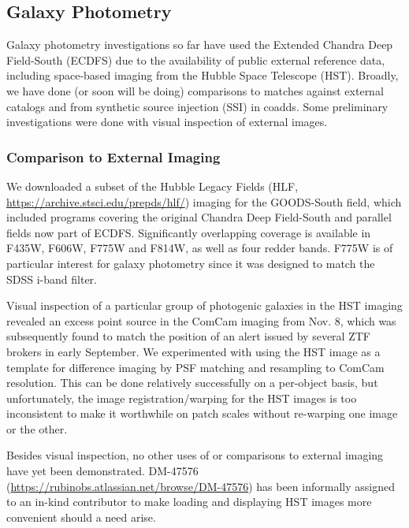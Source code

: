 \subsection{Galaxy Photometry}
\label{sec:galaxy_photometry}

Galaxy photometry investigations so far have used the Extended Chandra Deep Field-South (ECDFS) due to the availability of public external reference data, including space-based imaging from the Hubble Space Telescope (HST).
Broadly, we have done (or soon will be doing) comparisons to matches against external catalogs and from synthetic source injection (SSI) in coadds.
Some preliminary investigations were done with visual inspection of external images.

\iffalse                                %
\subsubsection{Comparison to External Imaging}
\label{subsec:galaxy_photometry_external_imaging}

We downloaded a subset of the Hubble Legacy Fields (HLF, \url{https://archive.stsci.edu/prepds/hlf/}) imaging for the GOODS-South field, which included programs covering the original Chandra Deep Field-South and parallel fields now part of ECDFS.
Significantly overlapping coverage is available in F435W, F606W, F775W and F814W, as well as four redder bands.
F775W is of particular interest for galaxy photometry since it was designed to match the SDSS i-band filter.

Visual inspection of a particular group of photogenic galaxies in the HST imaging revealed an excess point source in the ComCam imaging from Nov. 8, which was subsequently found to match the position of an alert issued by several ZTF brokers in early September.
We experimented with using the HST image as a template for difference imaging by PSF matching and resampling to ComCam resolution.
This can be done relatively successfully on a per-object basis, but unfortunately, the image registration/warping for the HST images is too inconsistent to make it worthwhile on patch scales without re-warping one image or the other.

Besides visual inspection, no other uses of or comparisons to external imaging have yet been demonstrated.
DM-47576 (\url{https://rubinobs.atlassian.net/browse/DM-47576}) has been informally assigned to an in-kind contributor to make loading and displaying HST images more convenient should a need arise.

